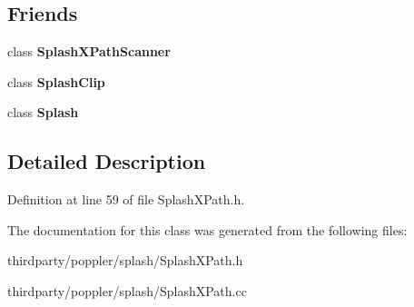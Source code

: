 \subsection*{Friends}
\begin{DoxyCompactItemize}
\item 
\mbox{\label{class_splash_x_path_aff30ffb052993748a0ae0324111f1d40}} 
class {\bfseries Splash\+X\+Path\+Scanner}
\item 
\mbox{\label{class_splash_x_path_a855f11553b2eb7549429edae34a1b955}} 
class {\bfseries Splash\+Clip}
\item 
\mbox{\label{class_splash_x_path_a6216f93151b4bec4a72771c40ff08ae8}} 
class {\bfseries Splash}
\end{DoxyCompactItemize}


\subsection{Detailed Description}


Definition at line 59 of file Splash\+X\+Path.\+h.



The documentation for this class was generated from the following files\+:\begin{DoxyCompactItemize}
\item 
thirdparty/poppler/splash/Splash\+X\+Path.\+h\item 
thirdparty/poppler/splash/Splash\+X\+Path.\+cc\end{DoxyCompactItemize}
